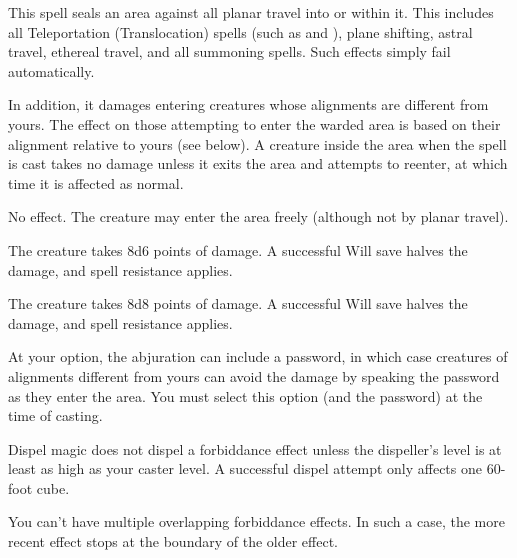 \spellrng{\rngmed}
\begin{spelleffect}
This spell seals an area against all planar travel into or within it. This includes all Teleportation (Translocation) spells (such as  and ), plane shifting, astral travel, ethereal travel, and all summoning spells. Such effects simply fail automatically.
\par In addition, it damages entering creatures whose alignments are different from yours. The effect on those attempting to enter the warded area is based on their alignment relative to yours (see below). A creature inside the area when the spell is cast takes no damage unless it exits the area and attempts to reenter, at which time it is affected as normal.
\par {} No effect. The creature may enter the area freely (although not by planar travel).
\par {} The creature takes 8d6 points of damage. A successful Will save halves the damage, and spell resistance applies.
\par {} The creature takes 8d8 points of damage. A successful Will save halves the damage, and spell resistance applies.
\par At your option, the abjuration can include a password, in which case creatures of alignments different from yours can avoid the damage by speaking the password as they enter the area. You must select this option (and the password) at the time of casting.
\end{spelleffect}
\begin{spellnotes}
\par Dispel magic does not dispel a forbiddance effect unless the dispeller's level is at least as high as your caster level. A successful dispel attempt only affects one 60-foot cube.
\par You can't have multiple overlapping forbiddance effects. In such a case, the more recent effect stops at the boundary of the older effect.
\end{spellnotes}

